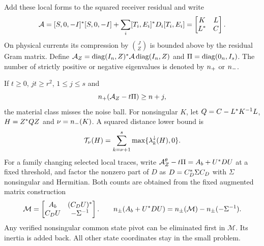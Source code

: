 Add these local forms to the squared receiver residual and write
\begin{equation}
 \A=[S,0,-I]\HH[S,0,-I]+
       \sum_i [T_i,E_i]\HH D_i[T_i,E_i]
   =\begin{bmatrix}K&L\\ L\HH&C\end{bmatrix}.                \label{eq:state}
\end{equation}
On physical currents its compression by $\binom{J}{Z}$ is bounded above by the residual Gram matrix. Define $\A_Z=\diag(I_n,Z)\HH\A\diag(I_n,Z)$ and $\Pi=\diag(0_n,I_s)$. The number of strictly positive or negative eigenvalues is denoted by $\nplus$ or $\nminus$.

\begin{theorem}\label{thm:set}
If $t\geq0$, $jt\geq r^2$, $1\leq j\leq s$ and
\begin{equation}
             \nplus(\A_Z-t\Pi)\geq n+j,                     \label{eq:border}
\end{equation}
the material class misses the noise ball. For nonsingular $K$, let
$Q=C-L\HH K^{-1}L$, $H=Z\HH QZ$ and $\nu=\nminus(K)$. A squared distance lower bound is
\begin{equation}
                 \T_\nu(H)=\sum_{k=\nu+1}^{s}
                      \max\{\lambda_k^\downarrow(H),0\}.       \label{eq:tail}
\end{equation}
For a family changing selected local traces, write
$\A_Z^\theta-t\Pi=A_b+U\HH D U$ at a fixed threshold, and factor
the nonzero part of $D$ as $D=C_D\HH\Sigma C_D$ with $\Sigma$ nonsingular and Hermitian. Both counts are obtained from the fixed augmented matrix construction
\begin{equation}
 \mathcal M=\begin{bmatrix}A_b&(C_DU)\HH\\ C_DU&-\Sigma^{-1}\end{bmatrix}.
 \qquad
 n_\pm(A_b+U\HH D U)=n_\pm(\mathcal M)-n_\pm(-\Sigma^{-1}).
                                                               \label{eq:augment}
\end{equation}
Any verified nonsingular common state pivot can be eliminated first in $\mathcal M$. Its inertia is added back. All other state coordinates stay in the small problem.
\end{theorem}
